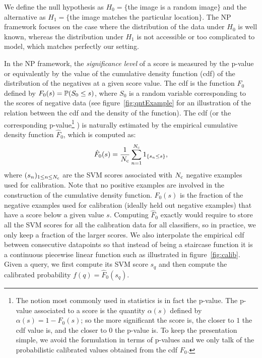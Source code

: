       We define the null hypothesis as $H_0=\{$the image is a random image$\}$ and the alternative as $H_1=\{$the image matches the particular location$\}$. The NP framework focuses on the case where the distribution of the data under $H_0$ is well known, whereas the distribution under $H_1$ is not accessible or too complicated to model, which matches perfectly our setting.

      In the NP framework, the \emph{significance level} of a score is measured by the p-value or equivalently by the value of the cumulative density function  (cdf) of the distribution of the negatives at a given score value. The cdf is the function $F_0$ defined by $F_0(s)=\mathbb{P}(S_0\leq s)$, where $S_0$ is a random variable corresponding to the scores of negative data (see figure~\ref{fig:qntExample} for an illustration of the relation between the cdf and the density of the function). The cdf 
      (or the corresponding p-value\footnote{
        The notion most commonly used in statistics is in fact the p-value. The p-value associated to a score is the quantity $\alpha(s)$ defined by $\alpha(s)=1-F_0(s)$; so the more significant the score is, the closer to $1$ the cdf value is, and the closer to $0$ the p-value is. To keep the presentation simple, we avoid the formulation in terms of p-values and we only talk of the probabilistic calibrated values obtained from the cdf $F_0$.
       }
      )
      is naturally estimated by the empirical cumulative density function $\hat{F}_0$, which is computed as: 
      \begin{equation}
        \hat{F}_0(s)=\frac{1}{N_{\text{c}}} \sum_{n=1}^{N_{\text{c}}} 1_{\{s_n \leq s\}},
        \label{eq:empiricalCDF}
      \end{equation}
      \noindent
      where $(s_n)_{1\leq n \leq N_{\text{c}} }$ are the SVM scores associated with $N_{\text{c}}$ negative examples used for calibration. Note that no positive examples are involved in the construction of the cumulative density function.
      $\hat{F}_0(s)$ 
      is the fraction of the negative examples used for calibration (ideally held out negative examples) that have a score below a given value $s$.
      Computing $\hat{F}_0$ exactly would require to store all the SVM scores for all the calibration data for all classifiers, so in practice, we only keep a fraction of the larger scores.
      We also interpolate the empirical cdf between consecutive datapoints so that instead of being a staircase function it is a continuous piecewise linear function such as illustrated in figure~\ref{fig:calib}. Given a query, we first compute its SVM score $s_q$ and then compute the calibrated probability $f(q)=\hat{F}_0(s_q)$.
